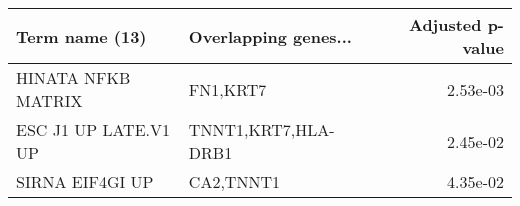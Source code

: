 \begin{tabular}{llr}
\toprule
      Term name (13) & Overlapping genes... &  Adjusted p-value \\
\midrule
  HINATA NFKB MATRIX &             FN1,KRT7 &          2.53e-03 \\
ESC J1 UP LATE.V1 UP &  TNNT1,KRT7,HLA-DRB1 &          2.45e-02 \\
     SIRNA EIF4GI UP &            CA2,TNNT1 &          4.35e-02 \\
\bottomrule
\end{tabular}

